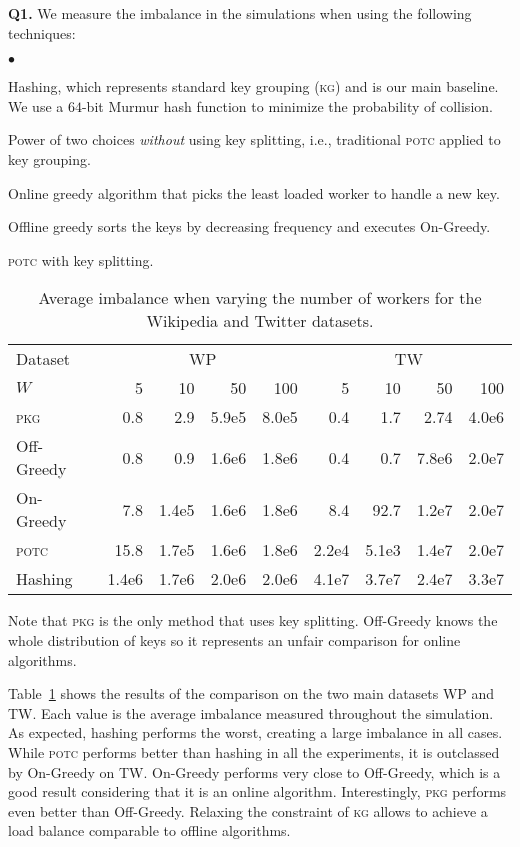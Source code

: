 \documentclass[10pt,conference,letterpaper]{IEEEtran}
\newcommand{\spara}[1]{\smallskip\noindent\textbf{#1}}
\newenvironment {squishlist}
{\begin{list}{$\bullet$}
  { \setlength{\itemsep}{1pt}
     \setlength{\parsep}{1pt}
     \setlength{\topsep}{1pt}
     \setlength{\partopsep}{1pt}
     \setlength{\leftmargin}{1.5em}
     \setlength{\labelwidth}{1em}
     \setlength{\labelsep}{0.5em} } }
{\end{list}}
\newcommand{\potc}{\textsc{p\textup{o}tc}\xspace}
\newcommand{\pkgs}{\textsc{pkg}\xspace}
\newcommand{\kg}{\textsc{kg}\xspace}
\begin{document}
\spara{Q1.}
We measure the imbalance in the simulations when using the following techniques:
\begin{squishlist}
\item[H:] Hashing, which represents standard key grouping (\kg) and is our main baseline.
We use a $64$-bit Murmur hash function to minimize the probability of collision.
\item[\potc:] Power of two choices \emph{without} using key splitting, i.e., traditional \potc applied to key grouping.
\item[On-Greedy:] Online greedy algorithm that picks the least loaded worker to handle a new key.
\item[Off-Greedy:] Offline greedy sorts the keys by decreasing frequency and executes On-Greedy.
\item[\pkgs:] \potc with key splitting. \end{squishlist}


\begin{table}[t]
\caption{Average imbalance when varying the number of workers for the Wikipedia and Twitter datasets.}
\tabcolsep=0.1cm
\centering
\small
\begin{tabular}{l r r r r r r r r}
\toprule
Dataset		&	\multicolumn{4}{c}{WP} 					&	\multicolumn{4}{c}{TW}					\\
\cmidrule(lr){2-5} \cmidrule(lr){6-9}
$W$			&	5		&	10		&	50		&	100		&	5		&	10		&	50		&	100		\\
\midrule
\pkgs		&	0.8		&	2.9		&	5.9e5	&	8.0e5	&	0.4		&	1.7		&	2.74		&	4.0e6	\\
Off-Greedy	&	0.8		&	0.9		&	1.6e6	&	1.8e6	&	0.4		&	0.7		&	7.8e6	&	2.0e7	\\
On-Greedy	&	7.8		&	1.4e5	&	1.6e6	&	1.8e6	&	8.4		&	92.7		&	1.2e7	&	2.0e7	\\
\potc			&	15.8		&	1.7e5	&	1.6e6	&	1.8e6	&	2.2e4	&	5.1e3	&	1.4e7	&	2.0e7	\\
Hashing		&	1.4e6	&	1.7e6	&	2.0e6	&	2.0e6	&	4.1e7	&	3.7e7	&	2.4e7	&	3.3e7	\\
\bottomrule
\end{tabular}
\label{tab:key-splitting}
\end{table}

Note that \pkgs is the only method that uses key splitting.
Off-Greedy knows the whole distribution of keys so it represents an unfair comparison for online algorithms.

Table~\ref{tab:key-splitting} shows the results of the comparison on the two main datasets WP and TW.
Each value is the average imbalance measured throughout the simulation.
As expected, hashing performs the worst, creating a large imbalance in all cases.
While \potc performs better than hashing in all the experiments, it is outclassed by On-Greedy on TW.
On-Greedy performs very close to Off-Greedy, which is a good result considering that it is an online algorithm.
Interestingly, \pkgs performs even better than Off-Greedy.
Relaxing the constraint of \kg allows to achieve a load balance comparable to offline algorithms.
\end{document}

